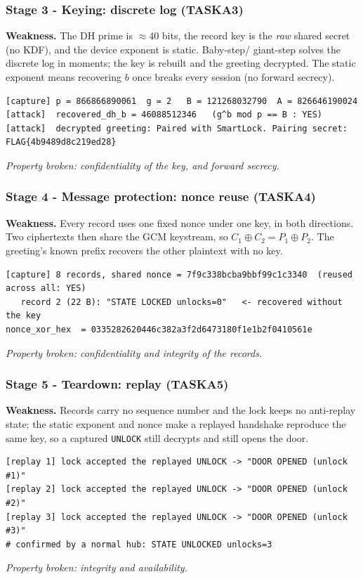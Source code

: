 \documentclass[11pt,a4paper]{article}
\newcommand{\prop}[1]{\textit{Property broken: #1.}}
\begin{document}
\subsubsection*{Stage 3 - Keying: discrete log (TASKA3)}
\textbf{Weakness.} The DH prime is $\approx$40 bits, the record key is the
\emph{raw} shared secret (no KDF), and the device exponent is static. Baby-step/
giant-step solves the discrete log in moments; the key is rebuilt and the greeting
decrypted. The static exponent means recovering $b$ once breaks every session (no
forward secrecy).
\begin{lstlisting}
[capture] p = 866866890061  g = 2   B = 121268032790  A = 826646190024
[attack]  recovered_dh_b = 46088512346   (g^b mod p == B : YES)
[attack]  decrypted greeting: Paired with SmartLock. Pairing secret: FLAG{4b9489d8c219ed28}
\end{lstlisting}
\prop{confidentiality of the key, and forward secrecy}

\subsubsection*{Stage 4 - Message protection: nonce reuse (TASKA4)}
\textbf{Weakness.} Every record uses one fixed nonce under one key, in both
directions. Two ciphertexts then share the GCM keystream, so $C_1\oplus C_2 =
P_1\oplus P_2$. The greeting's known prefix recovers the other plaintext with no key.
\begin{lstlisting}
[capture] 8 records, shared nonce = 7f9c338bcba9bbf99c1c3340  (reused across all: YES)
   record 2 (22 B): "STATE LOCKED unlocks=0"   <- recovered without the key
nonce_xor_hex  = 0335282620446c382a3f2d6473180f1e1b2f0410561e
\end{lstlisting}
\prop{confidentiality and integrity of the records}

\subsubsection*{Stage 5 - Teardown: replay (TASKA5)}
\textbf{Weakness.} Records carry no sequence number and the lock keeps no anti-replay
state; the static exponent and nonce make a replayed handshake reproduce the same
key, so a captured \texttt{UNLOCK} still decrypts and still opens the door.
\begin{lstlisting}
[replay 1] lock accepted the replayed UNLOCK -> "DOOR OPENED (unlock #1)"
[replay 2] lock accepted the replayed UNLOCK -> "DOOR OPENED (unlock #2)"
[replay 3] lock accepted the replayed UNLOCK -> "DOOR OPENED (unlock #3)"
# confirmed by a normal hub: STATE UNLOCKED unlocks=3
\end{lstlisting}
\prop{integrity and availability}
\end{document}
